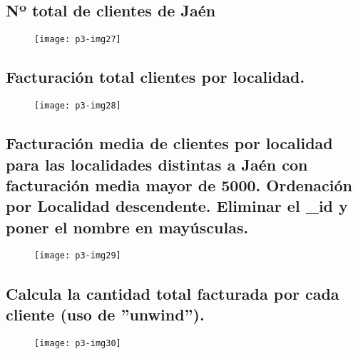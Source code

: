 \documentclass[10pt]{article}
\begin{document}
\subsection{Nº total de clientes de Jaén}

\begin{figure}[H]
	\begin{center}
 		\texttt{[image: p3-img27]}
	\end{center} 
\end{figure}


\subsection{Facturación total clientes por localidad.}

\begin{figure}[H]
	\begin{center}
 		\texttt{[image: p3-img28]}
	\end{center} 
\end{figure}


\subsection{Facturación media de clientes por localidad para las localidades distintas a Jaén con facturación media mayor de 5000. Ordenación por Localidad descendente. Eliminar el \_id y poner el nombre en mayúsculas.}

\begin{figure}[H]
	\begin{center}
 		\texttt{[image: p3-img29]}
	\end{center} 
\end{figure}


\subsection{Calcula la cantidad total facturada por cada cliente (uso de ''unwind'').}

\begin{figure}[H]
	\begin{center}
 		\texttt{[image: p3-img30]}
	\end{center} 
\end{figure}
\end{document}
